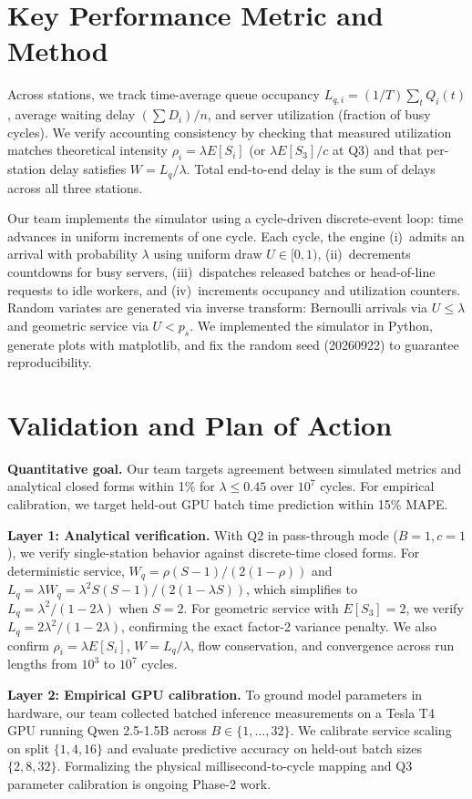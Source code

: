 \documentclass[conference]{IEEEtran}
\begin{document}
\section{Key Performance Metric and Method}
Across stations, we track time-average queue occupancy $L_{q,i} = (1/T)\sum_t Q_i(t)$, average waiting delay $(\sum D_i)/n$, and server utilization (fraction of busy cycles). We verify accounting consistency by checking that measured utilization matches theoretical intensity $\rho_i = \lambda E[S_i]$ (or $\lambda E[S_3]/c$ at Q3) and that per-station delay satisfies $W = L_q/\lambda$. Total end-to-end delay is the sum of delays across all three stations.

Our team implements the simulator using a cycle-driven discrete-event loop: time advances in uniform increments of one cycle. Each cycle, the engine (i)~admits an arrival with probability $\lambda$ using uniform draw $U \in [0,1)$, (ii)~decrements countdowns for busy servers, (iii)~dispatches released batches or head-of-line requests to idle workers, and (iv)~increments occupancy and utilization counters. Random variates are generated via inverse transform: Bernoulli arrivals via $U \le \lambda$ and geometric service via $U < p_s$. We implemented the simulator in Python, generate plots with matplotlib, and fix the random seed (20260922) to guarantee reproducibility.

\section{Validation and Plan of Action}
\textbf{Quantitative goal.} Our team targets agreement between simulated metrics and analytical closed forms within 1\% for $\lambda \le 0.45$ over $10^7$ cycles. For empirical calibration, we target held-out GPU batch time prediction within 15\% MAPE.

\textbf{Layer 1: Analytical verification.} With Q2 in pass-through mode ($B=1, c=1$), we verify single-station behavior against discrete-time closed forms. For deterministic service, $W_q = \rho(S-1)/(2(1-\rho))$ and $L_q = \lambda W_q = \lambda^2 S(S-1)/(2(1-\lambda S))$, which simplifies to $L_q = \lambda^2/(1-2\lambda)$ when $S=2$. For geometric service with $E[S_3]=2$, we verify $L_q = 2\lambda^2/(1-2\lambda)$, confirming the exact factor-2 variance penalty. We also confirm $\rho_i = \lambda E[S_i]$, $W = L_q/\lambda$, flow conservation, and convergence across run lengths from $10^3$ to $10^7$ cycles.

\textbf{Layer 2: Empirical GPU calibration.} To ground model parameters in hardware, our team collected batched inference measurements on a Tesla T4 GPU running Qwen 2.5-1.5B across $B \in \{1,\dots,32\}$. We calibrate service scaling on split $\{1,4,16\}$ and evaluate predictive accuracy on held-out batch sizes $\{2,8,32\}$. Formalizing the physical millisecond-to-cycle mapping and Q3 parameter calibration is ongoing Phase-2 work.
\end{document}
